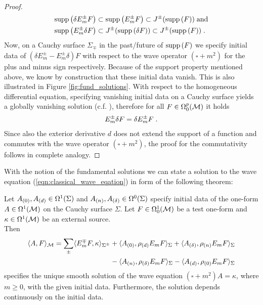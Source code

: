\begin{proof}
\begin{align}
\text{\upshape{supp}}\left(\delta E^\pm_m F \right) &\subset \text{\upshape{supp}}\left(E^\pm_m F \right) \subset J^\pm(\text{\upshape{supp}}\left(F \right)) \; \textrm{and} \\
\text{\upshape{supp}}\left(E^\pm_m \delta F \right) & \subset J^\pm(\text{\upshape{supp}}\left(\delta F \right)) \subset J^\pm(\text{\upshape{supp}}\left(F \right))\;.
\end{align}
Now, on a Cauchy surface $\Sigma_\mp$ in the past/future of $\text{\upshape{supp}}\left(F \right)$ we specify initial data of $(\delta E^\pm_m - E^\pm_m \delta) F $ with respect to the wave operator $(\square + m^2)$  for the plus and minus sign  respectively. Because of the support property mentioned above, we know by construction that these initial data vanish. This is also illustrated in Figure \ref{fig:fund_solutions}. With respect to the homogeneous differential equation, specifying vanishing initial data on a Cauchy surface yields a globally vanishing solution (c.f. \cite[Corollary 3.2.4]{baer_ginoux_pfaeffle}), therefore for all $F \in \Omega^p_0(\mathcal{M})$ it holds
\begin{align}
E^\pm_m \delta F= \delta E^\pm_m F\;.
\end{align}
Since also the exterior derivative $d$ does not extend the support of a function and commutes with the wave operator $(\square + m^2)$, the proof for the commutativity follows in complete analogy.
\end{proof}
%
%
With the notion of the fundamental solutions we can state a solution to the wave equation (\ref{eqn:classical_wave_eqation}) in form of the following theorem:
%
%
\begin{theorem}
 Let ${A_{(0)}},{A_{(d)}} \in \Omega^1(\Sigma)$ and ${A_{(n)}},{A_{(\delta)}} \in \Omega^0(\Sigma)$ specify initial data of the one-form $A\in \Omega^1(\mathcal{M})$ on the Cauchy surface $\Sigma$. Let $F \in \Omega^1_0(\mathcal{M})$ be a test one-form and $\kappa \in \Omega^1(\mathcal{M})$ be an external source.\\
 Then
 \begin{align}
  \langle A, F \rangle_{\mathcal{M}} = \sum\limits_\pm \langle E_m^\mp F , \kappa \rangle_{\Sigma^\pm}
  &+ \langle {A_{(0)}} , \rho_{(d)} E_m F \rangle_\Sigma
  + \langle {A_{(\delta)}} , \rho_{(n)} E_m F \rangle_\Sigma \notag \\
  &- \langle {A_{(n)}} , \rho_{(\delta)} E_m F \rangle_\Sigma
  - \langle {A_{(d)}} , \rho_{(0)} E_m F \rangle_\Sigma
 \end{align}
specifies the unique smooth solution of the wave equation $(\square + m^2)A= \kappa$, where $m \geq 0$, with the given initial data. Furthermore, the solution depends continuously on the initial data. \label{thm:solution_wave_equation}
\end{theorem}
